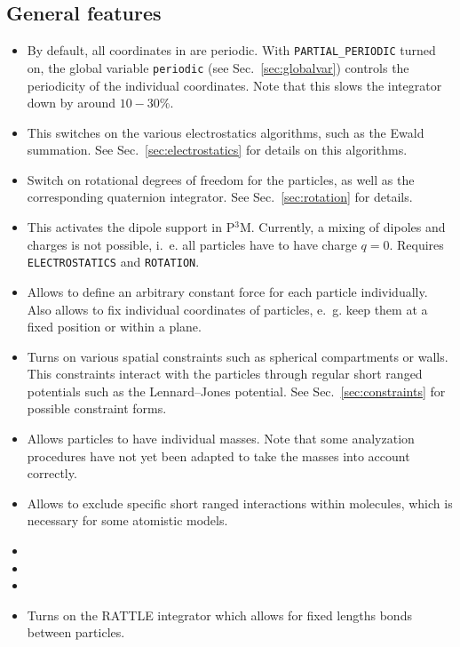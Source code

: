 \subsection{General features}
\begin{itemize}
\item {} By default, all coordinates in \es{} are periodic. With
  \texttt{PARTIAL\_PERIODIC} turned on, the \es{} global variable \texttt{periodic} (see
  Sec.~\ref{sec:globalvar}) controls the periodicity of the individual coordinates. Note that this
  slows the integrator down by around $10-30\%$.
\item {} This switches on the various electrostatics algorithms, such as
  the Ewald summation. See Sec.~\ref{sec:electrostatics} for details on this algorithms.
\item {} Switch on rotational degrees of freedom for the particles, as well as
  the corresponding quaternion integrator. See Sec.~\ref{sec:rotation} for details.
\item {} This activates the dipole support in P$^3$M. Currently, a mixing of
  dipoles and charges is not possible, i.~e. all particles have to have charge $q=0$.
  Requires \texttt{ELECTROSTATICS} and \texttt{ROTATION}.
\item {} Allows to define an arbitrary constant force for each particle
  individually. Also allows to fix individual coordinates of particles, e.~g. keep them at a fixed
  position or within a plane.
\item {} Turns on various spatial constraints such as spherical compartments
  or walls. This constraints interact with the particles through regular short ranged potentials
  such as the Lennard--Jones potential. See Sec.~\ref{sec:constraints} for possible constraint
  forms.
\item {} Allows particles to have individual masses. Note that some analyzation
  procedures have not yet been adapted to take the masses into account correctly.
\item {} Allows to exclude specific short ranged interactions within
  molecules, which is necessary for some atomistic models.
\item {}
\item {}
\item {}
\item {} Turns on the RATTLE integrator which allows for fixed lengths
  bonds between particles.
\end{itemize}


